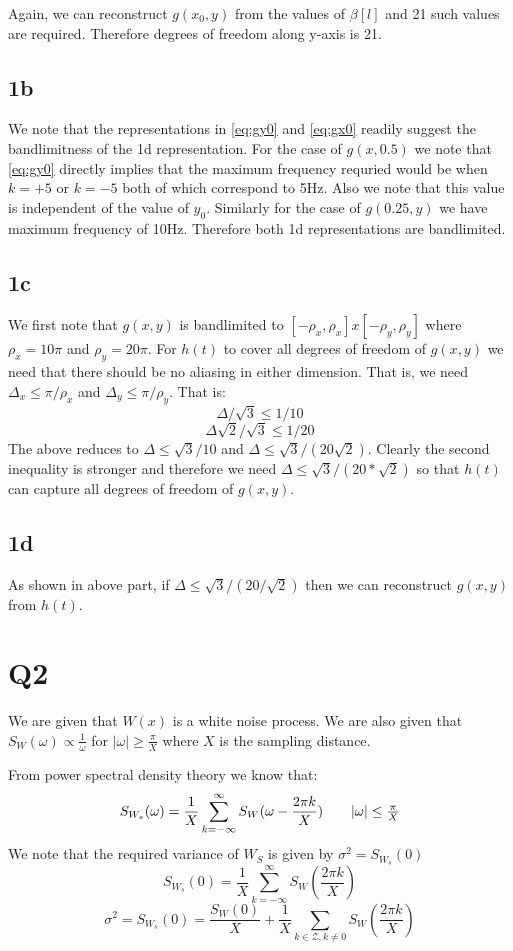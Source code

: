 \documentclass{article}
\begin{document}
Again, we can reconstruct $g(x_0, y)$ from the values of $\beta[l]$ and 21 such values are required. Therefore degrees of freedom along y-axis is 21.

\subsection*{1b}
We note that the representations in \ref{eq:gy0} and \ref{eq:gx0} readily suggest the bandlimitness of the 1d representation. For the case of $g(x, 0.5)$ we note that \ref{eq:gy0} directly implies that the maximum frequency requried would be when $k = +5$ or $k = -5$ both of which correspond to 5Hz. Also we note that this value is independent of the value of $y_0$. Similarly for the case of $g(0.25, y)$ we have maximum frequency of 10Hz. Therefore both 1d representations are bandlimited.

\subsection*{1c}
We first note that $g(x,y)$ is bandlimited to $[-\rho_x, \rho_x] x [-\rho_y, \rho_y]$ where $\rho_x = 10\pi$ and $\rho_y = 20 \pi$. For $h(t)$ to cover all degrees of freedom of $g(x, y)$ we need that there should be no aliasing in either dimension. That is, we need $\Delta_x \le \pi / \rho_x$ and $\Delta_y \le \pi / \rho_y$. That is:
$$\Delta / \sqrt{3} \le 1 /10$$
$$\Delta \sqrt{2} / \sqrt{3} \le 1 / 20$$
The above reduces to $\Delta \le \sqrt{3} / 10$ and $\Delta \le \sqrt{3}/(20 \sqrt{2})$. Clearly the second inequality is stronger and therefore we need $\Delta \le \sqrt{3} / (20 * \sqrt{2})$ so that $h(t)$ can capture all degrees of freedom of $g(x, y)$.

\subsection*{1d}
As shown in above part, if $\Delta \le \sqrt{3} / (20 / \sqrt{2})$ then we can reconstruct $g(x, y)$ from $h(t)$.

\section*{Q2}
We are given that $W(x)$ is a white noise process. We are also given that $S_W(\omega) \propto \frac{1}{\omega}$ for $|\omega| \ge \frac{\pi}{X}$ where $X$ is the sampling distance.

From power spectral density theory we know that:
\begin{align}
  \label{eq:psd1}
  S_{W_s}(\omega) = \frac{1}{X}\sum_{k=-\infty}^{\infty}S_W(\omega - \frac{2\pi k}{X}) \tag*{$|\omega| \le \frac{\pi}{X}$}
\end{align}
We note that the required variance of $W_S$ is given by $\sigma^2 = S_{W_s}(0)$
$$S_{W_s}(0) = \frac{1}{X} \sum_{k=-\infty}^{\infty}S_W(\frac{2\pi k}{X})$$
$$\sigma^2 = S_{W_s}(0) = \frac{S_W(0)}{X} + \frac{1}{X} \sum_{k \in \mathcal{Z}, k \ne 0} S_W(\frac{2 \pi k}{X})$$
\end{document}
